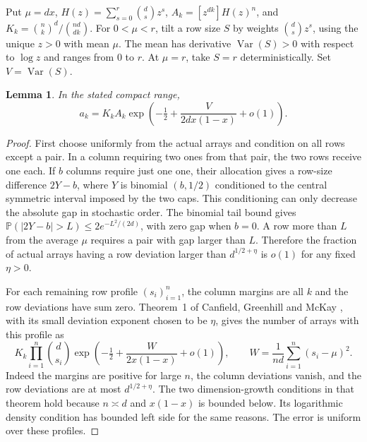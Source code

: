 \documentclass[11pt]{article}
\newtheorem{lemma}{Lemma}
\newcommand{\Prob}{\mathbb P}
\newcommand{\Var}{\operatorname{Var}}
\begin{document}
Put $\mu=dx$, $H(z)=\sum_{s=0}^r\binom ds z^s$,
$A_k=[z^{dk}]H(z)^n$, and $K_k=\binom nk^d/\binom{nd}{dk}$.
For $0<\mu<r$, tilt a row size $S$ by weights $\binom ds z^s$,
using the unique $z>0$ with mean $\mu$. The mean has derivative
$\Var(S)>0$ with respect to $\log z$ and ranges from 0 to $r$.
At $\mu=r$, take $S=r$ deterministically. Set $V=\Var(S)$.

\begin{lemma}\label{lem:enum}
In the stated compact range,
\begin{equation}\label{eq:enum}
a_k=K_kA_k\exp\left(-\tfrac12+\frac{V}{2d x(1-x)}+o(1)\right).
\end{equation}
\end{lemma}
\begin{proof}
First choose uniformly from the actual arrays and condition on all
rows except a pair. In a column requiring two ones from that pair,
the two rows receive one each. If $b$ columns require just one one,
their allocation gives a row-size difference $2Y-b$, where $Y$ is
binomial $(b,1/2)$ conditioned to the central symmetric interval
imposed by the two caps. This conditioning can only decrease the
absolute gap in stochastic order. The binomial tail bound gives
$\Prob(|2Y-b|>L)\le2e^{-L^2/(2d)}$, with zero gap when $b=0$.
A row more than $L$ from the average $\mu$ requires a pair with gap
larger than $L$. Therefore the fraction of actual arrays having a row
deviation larger than $d^{1/2+\eta}$ is $o(1)$ for any fixed $\eta>0$.

For each remaining row profile $(s_i)_{i=1}^n$, the column margins
are all $k$ and the row deviations have sum zero. Theorem~1 of
Canfield, Greenhill and McKay \cite{CGM}, with its small deviation
exponent chosen to be $\eta$, gives the number of arrays with this
profile as
\begin{equation}\label{eq:cgm}
K_k \prod_{i=1}^n\binom d{s_i}
 \exp\left(-\tfrac12+\frac{W}{2x(1-x)}+o(1)\right),
\qquad
W=\frac1{nd}\sum_{i=1}^n(s_i-\mu)^2 .
\end{equation}
Indeed the margins are positive for large $n$, the column deviations
vanish, and the row deviations are at most $d^{1/2+\eta}$. The two
dimension-growth conditions in that theorem hold because $n\asymp d$
and $x(1-x)$ is bounded below. Its logarithmic density condition has
bounded left side for the same reasons. The error is uniform over
these profiles.


\end{proof}
\end{document}
